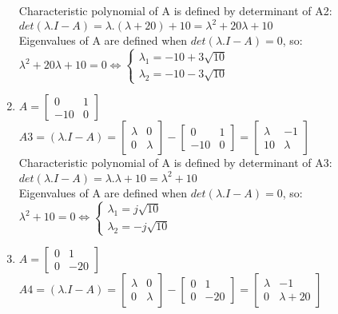 \documentclass[14pt,a4paper]{article}
\begin{document}
\begin{enumerate}
	Characteristic polynomial of A is defined by determinant of A2:\\
	$det(\lambda .I-A) = \lambda.(\lambda +20) +10 = \lambda^2 + 20\lambda +10$ \\
	Eigenvalues of A are defined when $ det(\lambda .I-A) = 0$, so: \\
	$\lambda^2 + 20\lambda +10 = 0  \Leftrightarrow \begin{cases} \lambda_1 = -10 + 3\sqrt{10}  \\ \lambda_2 = -10 - 3\sqrt{10} \end{cases} $ \\
	
	\item 
	$A = \begin{bmatrix} 0&1 \\ -10&0 \end{bmatrix} $ \\
	$A3 = (\lambda .I-A) = \begin{bmatrix} \lambda & 0 \\ 0 & \lambda \end{bmatrix} - \begin{bmatrix} 0&1 \\ -10&0 \end{bmatrix} = \begin{bmatrix} \lambda & -1 \\ 10 & \lambda \end{bmatrix} $ \\
	
	Characteristic polynomial of A is defined by determinant of A3:\\
	$det(\lambda .I-A) = \lambda.\lambda +10 = \lambda^2 +10$ \\
	Eigenvalues of A are defined when $ det(\lambda .I-A) = 0$, so: \\
	$\lambda^2 +10 = 0  \Leftrightarrow \begin{cases} \lambda_1 = j\sqrt{10}  \\ \lambda_2 = -j\sqrt{10} \end{cases} $ \\
	
	\item 
	$A = \begin{bmatrix} 0&1 \\ 0&-20 \end{bmatrix} $ \\
	$A4 = (\lambda .I-A) = \begin{bmatrix} \lambda & 0 \\ 0 & \lambda \end{bmatrix} - \begin{bmatrix} 0&1 \\ 0&-20 \end{bmatrix} = \begin{bmatrix} \lambda & -1 \\ 0 & \lambda +20 \end{bmatrix} $ \\
		

\end{enumerate}
\end{document}
